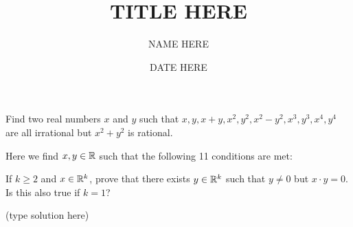 \documentclass[11pt]{article}
\begin{document}
\title{TITLE HERE}
\author{NAME HERE}
\date{DATE HERE}
\maketitle



 \begin{problem}{1}
    Find two real numbers $x$ and $y$ such that $x, y, x+y, x^2, y^2, x^2-y^2,x^3,y^3,x^4,y^4$ are all irrational but $x^2+y^2$ is rational.
 \end{problem}

 \solution
  Here we find $x,y \in {\mathbb R}$ such that the following 11 conditions are met:
   \solutionends



 \begin{problem}{2}
    If $k\ge 2$ and $x\in{\mathbb R}^k$, prove that there exists $y\in{\mathbb R}^k$ such that $y\neq 0$ but $x\cdot y=0$. Is this also true if $k=1$?
 \end{problem}

 \proof
  (type solution here)
 \proofends
\end{document}
